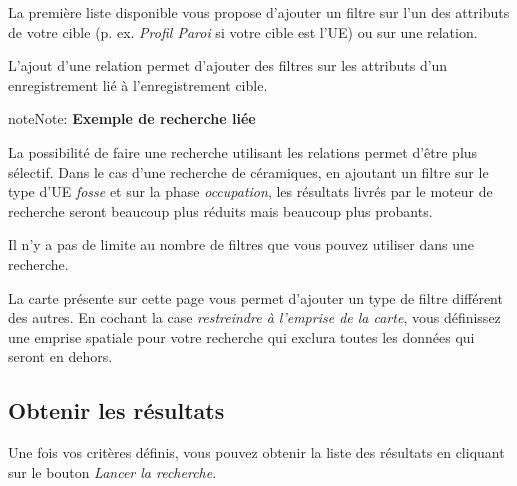 \documentclass[letterpaper,10pt,french]{sphinxmanual}
\begin{document}
La première liste disponible vous propose d'ajouter un filtre sur l'un des attributs de votre cible (p. ex. \emph{Profil Paroi} si votre cible est l'UE) ou sur une relation.
\begin{figure}[htbp]
\centering

\end{figure}

L'ajout d'une relation permet d'ajouter des filtres sur les attributs d'un enregistrement lié à l'enregistrement cible.

\begin{notice}{note}{Note:}
\textbf{Exemple de recherche liée}

La possibilité de faire une recherche utilisant les relations permet d'être plus sélectif. Dans le cas d'une recherche de céramiques, en ajoutant un filtre sur le type d'UE \emph{fosse} et sur la phase \emph{occupation}, les résultats livrés par le moteur de recherche seront beaucoup plus réduits mais beaucoup plus probants.
\end{notice}

Il n'y a pas de limite au nombre de filtres que vous pouvez utiliser dans une recherche.

La carte présente sur cette page vous permet d'ajouter un type de filtre différent des autres. En cochant la case \emph{restreindre à l'emprise de la carte}, vous définissez une emprise spatiale pour votre recherche qui exclura toutes les données qui seront en dehors.


\subsection{Obtenir les résultats}
\label{manuel/formulaire_recherche:obtenir-les-resultats}
Une fois vos critères définis, vous pouvez obtenir la liste des résultats en cliquant sur le bouton \emph{Lancer la recherche}.
\end{document}
